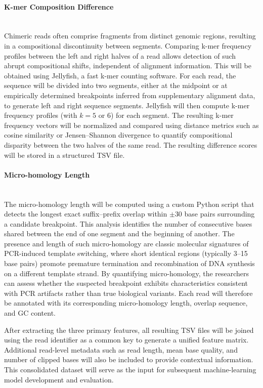 \paragraph{K-mer Composition Difference}\hfill\\
Chimeric reads often comprise fragments from distinct genomic regions, resulting in a compositional discontinuity between segments. Comparing k-mer frequency profiles between the left and right halves of a read allows detection of such abrupt compositional shifts, independent of alignment information. This will be obtained using Jellyfish, a fast k-mer counting software. For each read, the sequence will be divided into two segments, either at the midpoint or at empirically determined breakpoints inferred from supplementary alignment data, to generate left and right sequence segments. Jellyfish will then compute k-mer frequency profiles (with $k = 5$ or $6$) for each segment. The resulting k-mer frequency vectors will be normalized and compared using distance metrics such as cosine similarity or Jensen–Shannon divergence to quantify compositional disparity between the two halves of the same read. The resulting difference scores will be stored in a structured TSV file.

\paragraph{Micro-homology Length}\hfill\\
The micro-homology length will be computed using a custom Python script that detects the longest exact suffix–prefix overlap within $\pm 30$ base pairs surrounding a candidate breakpoint. This analysis identifies the number of consecutive bases shared between the end of one segment and the beginning of another. The presence and length of such micro-homology are classic molecular signatures of PCR-induced template switching, where short identical regions (typically 3–15 base pairs) promote premature termination and recombination of DNA synthesis on a different template strand. By quantifying micro-homology, the researchers can assess whether the suspected breakpoint exhibits characteristics consistent with PCR artifacts rather than true biological variants. Each read will therefore be annotated with its corresponding micro-homology length, overlap sequence, and GC content.

After extracting the three primary features, all resulting TSV files will be joined using the read identifier as a common key to generate a unified feature matrix. Additional read-level metadata such as read length, mean base quality, and number of clipped bases will also be included to provide contextual information. This consolidated dataset will serve as the input for subsequent machine-learning model development and evaluation.

